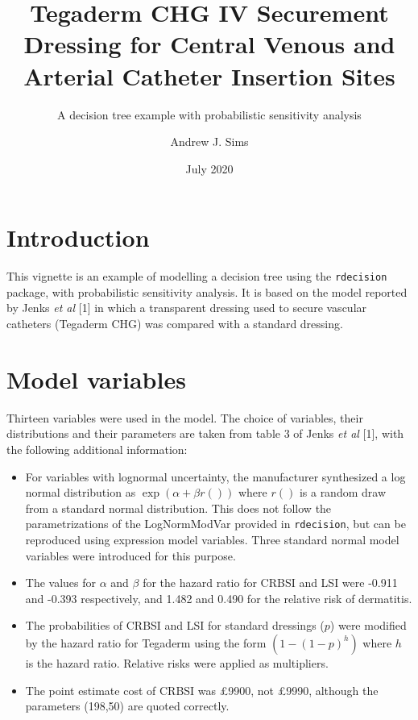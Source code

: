 \documentclass[
]{article}
\title{Tegaderm CHG IV Securement Dressing for Central Venous and
Arterial Catheter Insertion Sites}
\subtitle{A decision tree example with probabilistic sensitivity
analysis}
\author{Andrew J. Sims}
\date{July 2020}
\providecommand{\tightlist}{%
  \setlength{\itemsep}{0pt}\setlength{\parskip}{0pt}}
\begin{document}
\maketitle

\hypertarget{introduction}{%
\section{Introduction}\label{introduction}}

This vignette is an example of modelling a decision tree using the
\texttt{rdecision} package, with probabilistic sensitivity analysis. It
is based on the model reported by Jenks \emph{et al} {[}1{]} in which a
transparent dressing used to secure vascular catheters (Tegaderm CHG)
was compared with a standard dressing.

\hypertarget{model-variables}{%
\section{Model variables}\label{model-variables}}

Thirteen variables were used in the model. The choice of variables,
their distributions and their parameters are taken from table 3 of Jenks
\emph{et al} {[}1{]}, with the following additional information:

\begin{itemize}
\tightlist
\item
  For variables with lognormal uncertainty, the manufacturer synthesized
  a log normal distribution as \(\exp(\alpha + \beta r())\) where
  \(r()\) is a random draw from a standard normal distribution. This
  does not follow the parametrizations of the LogNormModVar provided in
  \texttt{rdecision}, but can be reproduced using expression model
  variables. Three standard normal model variables were introduced for
  this purpose.
\item
  The values for \(\alpha\) and \(\beta\) for the hazard ratio for CRBSI
  and LSI were -0.911 and -0.393 respectively, and 1.482 and 0.490 for
  the relative risk of dermatitis.
\item
  The probabilities of CRBSI and LSI for standard dressings (\(p\)) were
  modified by the hazard ratio for Tegaderm using the form
  \((1-(1-p)^h)\) where \(h\) is the hazard ratio. Relative risks were
  applied as multipliers.
\item
  The point estimate cost of CRBSI was £9900, not £9990, although the
  parameters (198,50) are quoted correctly.
\end{itemize}
\end{document}
